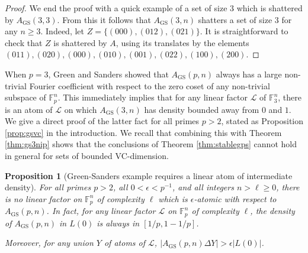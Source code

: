 \documentclass[12pt,oneside,british,a4wide]{amsart}
\newtheorem{proposition}[theorem]{Proposition}
\numberwithin{equation}{section}
\theoremstyle{definition}
\def\F{\mathbb{F}}
\def\GS{\mathrm{GS}}
\def\e{\epsilon}
\newcommand{\calL}{\mathcal{L}}
\begin{document}
\begin{proof}
We end the proof with a quick example of a set of size $3$ which is shattered by $A_{\GS}(3,3)$. From this it follows that $A_{\GS}(3,n)$ shatters a set of size $3$ for any $n\geq 3$. Indeed, let $Z=\{(000), (012),(021)\}$.  It is straightforward to check that $Z$ is shattered by $A$, using its translates by the elements $(011), (020), (000), (010), (001), (022), (100), (200)$.  
\end{proof}


When $p=3$, Green and Sanders showed that $A_{\GS}(p,n)$ always has a large non-trivial Fourier coefficient with respect to the zero coset of any non-trivial subspace of $\F_p^n$. This immediately implies that for any linear factor $\calL$ of $\F_3^n$, there is an atom of $\calL$ on which $A_{\GS}(3,n)$ has density bounded away from $0$ and $1$. We give a direct proof of the latter fact for all primes $p>2$, stated as Proposition \ref{prop:gsvc} in the introduction.  We recall that combining this with Theorem \ref{thm:gs3nip} shows that the conclusions of Theorem \ref{thm:stablegps} cannot hold in general for sets of bounded VC-dimension.

\begin{proposition}[Green-Sanders example requires a linear atom of intermediate density]\label{prop:gsexirr}
For all primes $p>2$, all  $0<\e<p^{-1}$, and all integers $n>\ell\geq 0$,   there is no linear factor on $\F_p^n$ of complexity $\ell$ which is $\e$-atomic with respect to $A_{\GS}(p,n)$.  In fact, for any linear factor $\calL$ on $\F_p^n$ of complexity $\ell$, the density of $A_{\GS}(p,n)$ in $L(0)$ is always in  $[1/p,1-1/p]$.  

Moreover, for any union $Y$ of atoms of $\calL$, $|A_{\GS}(p,n)\Delta Y|>\e |L(0)|$.
\end{proposition}
\end{document}
